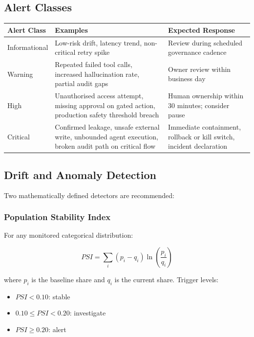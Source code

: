 \documentclass[11pt,a4paper]{article}
\begin{document}
\subsection{Alert Classes}

\begin{center}
\begin{tabularx}{\textwidth}{P{0.14\textwidth}Y Y}
\toprule
\textbf{Alert Class} & \textbf{Examples} & \textbf{Expected Response} \\
\midrule
Informational & Low-risk drift, latency trend, non-critical retry spike & Review during scheduled governance cadence \\
Warning & Repeated failed tool calls, increased hallucination rate, partial audit gaps & Owner review within business day \\
High & Unauthorised access attempt, missing approval on gated action, production safety threshold breach & Human ownership within 30 minutes; consider pause \\
Critical & Confirmed leakage, unsafe external write, unbounded agent execution, broken audit path on critical flow & Immediate containment, rollback or kill switch, incident declaration \\
\bottomrule
\end{tabularx}
\end{center}

\subsection{Drift and Anomaly Detection}

Two mathematically defined detectors are recommended:

\subsubsection{Population Stability Index}

For any monitored categorical distribution:

\begin{equation}
PSI = \sum_{i}(p_i - q_i)\ln\left(\frac{p_i}{q_i}\right)
\end{equation}

where \(p_i\) is the baseline share and \(q_i\) is the current share. Trigger levels:

\begin{itemize}[nosep]
    \item \(PSI < 0.10\): stable
    \item \(0.10 \le PSI < 0.20\): investigate
    \item \(PSI \ge 0.20\): alert
\end{itemize}
\end{document}

